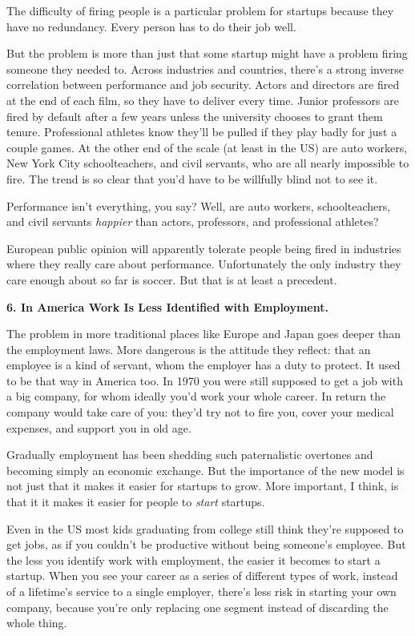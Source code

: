 The difficulty of firing people is a particular problem for startups
because they have no redundancy. Every person has to do their job well.

But the problem is more than just that some startup might have a problem
firing someone they needed to. Across industries and countries, there's
a strong inverse correlation between performance and job security.
Actors and directors are fired at the end of each film, so they have to
deliver every time. Junior professors are fired by default after a few
years unless the university chooses to grant them tenure. Professional
athletes know they'll be pulled if they play badly for just a couple
games. At the other end of the scale (at least in the US) are auto
workers, New York City schoolteachers, and civil servants, who are all
nearly impossible to fire. The trend is so clear that you'd have to be
willfully blind not to see it.

Performance isn't everything, you say? Well, are auto workers,
schoolteachers, and civil servants \emph{happier} than actors,
professors, and professional athletes?

European public opinion will apparently tolerate people being fired in
industries where they really care about performance. Unfortunately the
only industry they care enough about so far is soccer. But that is at
least a precedent.

\textbf{6. In America Work Is Less Identified with Employment.}

The problem in more traditional places like Europe and Japan goes deeper
than the employment laws. More dangerous is the attitude they reflect:
that an employee is a kind of servant, whom the employer has a duty to
protect. It used to be that way in America too. In 1970 you were still
supposed to get a job with a big company, for whom ideally you'd work
your whole career. In return the company would take care of you: they'd
try not to fire you, cover your medical expenses, and support you in old
age.

Gradually employment has been shedding such paternalistic overtones and
becoming simply an economic exchange. But the importance of the new
model is not just that it makes it easier for startups to grow. More
important, I think, is that it it makes it easier for people to
\emph{start} startups.

Even in the US most kids graduating from college still think they're
supposed to get jobs, as if you couldn't be productive without being
someone's employee. But the less you identify work with employment, the
easier it becomes to start a startup. When you see your career as a
series of different types of work, instead of a lifetime's service to a
single employer, there's less risk in starting your own company, because
you're only replacing one segment instead of discarding the whole thing.

